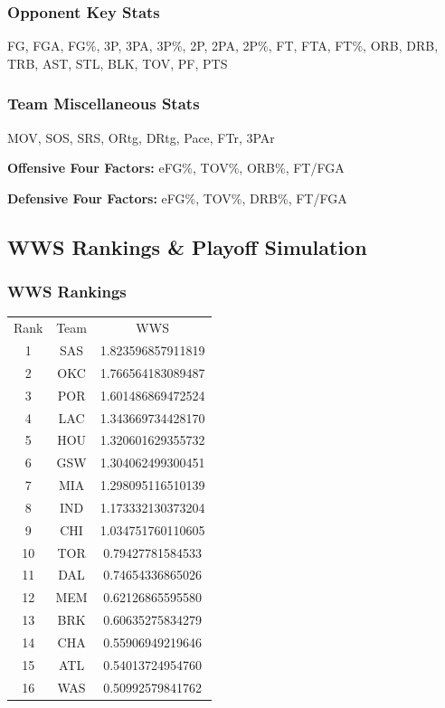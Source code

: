 \documentclass[a4paper,11pt]{article}
\begin{document}
\subsubsection{Opponent Key Stats}
FG, FGA, FG\%, 3P, 3PA, 3P\%, 2P, 2PA, 2P\%, FT, FTA, FT\%, ORB, DRB, TRB, AST, STL, BLK, TOV, PF, PTS

\subsubsection{Team Miscellaneous Stats}
MOV, SOS, SRS, ORtg, DRtg, Pace, FTr, 3PAr

\noindent \textbf{Offensive Four Factors:} eFG\%, TOV\%, ORB\%, FT/FGA

\noindent \textbf{Defensive Four Factors:} eFG\%, TOV\%, DRB\%, FT/FGA


\subsection{WWS Rankings \& Playoff Simulation}

\subsubsection{WWS Rankings}
\begin{table}[ht]
\centering
    \begin{tabular}{ccc}
    Rank & Team & WWS               \\
    1    & SAS  & 1.823596857911819 \\
    2    & OKC  & 1.766564183089487 \\
    3    & POR  & 1.601486869472524 \\
    4    & LAC  & 1.343669734428170 \\
    5    & HOU  & 1.320601629355732 \\
    6    & GSW  & 1.304062499300451 \\
    7    & MIA  & 1.298095116510139 \\
    8    & IND  & 1.173332130373204 \\
    9    & CHI  & 1.034751760110605 \\
    10    & TOR  & 0.79427781584533 \\
    11    & DAL  & 0.74654336865026 \\
    12    & MEM  & 0.62126865595580 \\
    13    & BRK  & 0.60635275834279 \\
    14    & CHA & 0.55906949219646 \\
    15    & ATL  & 0.54013724954760 \\
    16    & WAS  & 0.50992579841762 \\
    \end{tabular}
\end{table}
\end{document}
